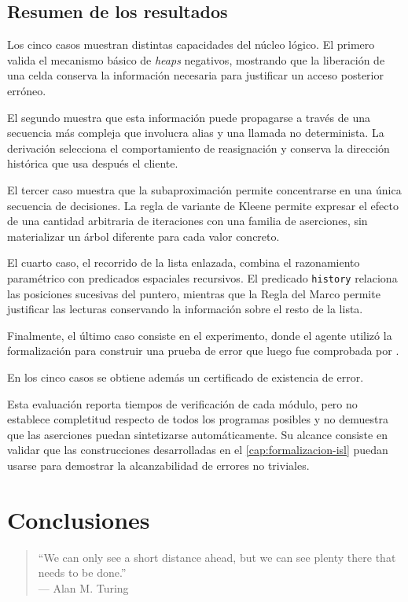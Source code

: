 \documentclass[a4paper,	11pt]{report}
\begin{document}
\section{Resumen de los resultados}
Los cinco casos muestran distintas capacidades del núcleo lógico.
El primero valida el mecanismo básico de \emph{heaps} negativos,
mostrando que la liberación de una celda conserva la información necesaria para justificar un acceso posterior erróneo.

El segundo muestra que esta información puede propagarse a través de una secuencia más compleja que involucra alias y una llamada no determinista.
La derivación selecciona el comportamiento de reasignación y conserva la dirección histórica que usa después el cliente.

El tercer caso muestra que la subaproximación permite concentrarse en una única secuencia de decisiones.
La regla de variante de Kleene permite expresar el efecto de una cantidad arbitraria de iteraciones con una familia de aserciones,
sin materializar un árbol diferente para cada valor concreto.

El cuarto caso,
el recorrido de la lista enlazada,
combina el razonamiento paramétrico con predicados espaciales recursivos.
El predicado \lstinline|history| relaciona las posiciones sucesivas del puntero,
mientras que la Regla del Marco permite justificar las lecturas conservando la información sobre el resto de la lista.

Finalmente,
el último caso consiste en el experimento,
donde el agente utilizó la formalización para construir una prueba de error que luego fue comprobada por \fstar{}. 

En los cinco casos se obtiene además un certificado de existencia de error.

Esta evaluación reporta tiempos de verificación de cada módulo,
pero no establece completitud respecto de todos los programas posibles y no demuestra que las aserciones puedan sintetizarse automáticamente.
Su alcance consiste en validar que las construcciones desarrolladas en el \autoref{cap:formalizacion-isl}
puedan usarse para demostrar la alcanzabilidad de errores no triviales.


\chapter{Conclusiones}
\label{cap:conclusiones}
\begin{quote}
``We can only see a short distance ahead, but we can see plenty there that needs to be done.'' \\
\raggedleft --- Alan M. Turing
\end{quote}
\end{document}
